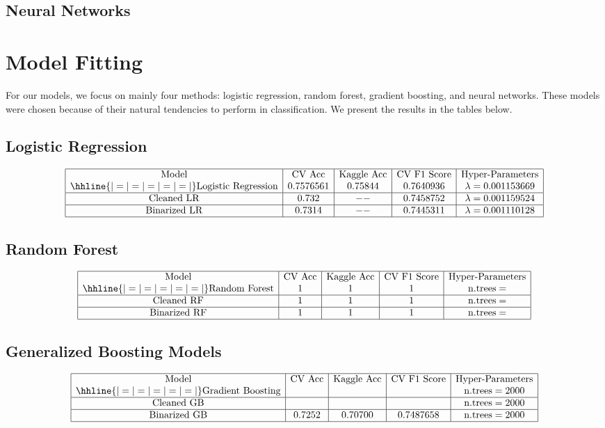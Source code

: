 \documentclass{article}
\begin{document}
\subsection{Neural Networks}

\section{Model Fitting}
For our models, we focus on mainly four methods: logistic regression, random forest, gradient boosting, and neural networks. These models were chosen because of their natural tendencies to perform in classification. We present the results in the tables below.

\subsection{Logistic Regression}
$$\begin{array}{|c|c|c|c|c|}
\hline
\text{Model} & \text{CV Acc} & \text{Kaggle Acc} & \text{CV F1 Score} & \text{Hyper-Parameters} \\
\hhline{|=|=|=|=|=|}
\text{Logistic Regression} & 0.7576561 & 0.75844 & 0.7640936 & \lambda = 0.001153669\\
\hline
\text{Cleaned LR} & 0.732 & -- & 0.7458752 & \lambda = 0.001159524 \\
\hline
\text{Binarized LR} & 0.7314 & -- & 0.7445311 & \lambda = 0.001110128 \\
\hline
\end{array}$$

\subsection{Random Forest}
$$\begin{array}{|c|c|c|c|c|}
\hline
\text{Model} & \text{CV Acc} & \text{Kaggle Acc} & \text{CV F1 Score} & \text{Hyper-Parameters}   \\
\hhline{|=|=|=|=|=|}
\text{Random Forest} & 1 & 1 & 1 & \text{n.trees} = \\
\hline
\text{Cleaned RF} & 1 & 1 & 1 & \text{n.trees} = \\
\hline
\text{Binarized RF} & 1 & 1 & 1 & \text{n.trees} = \\
\hline
\end{array}$$

\subsection{Generalized Boosting Models}
$$\begin{array}{|c|c|c|c|c|}
\hline
\text{Model} & \text{CV Acc} & \text{Kaggle Acc} & \text{CV F1 Score} & \text{Hyper-Parameters} \\
\hhline{|=|=|=|=|=|}
\text{Gradient Boosting} &  &  &  & \text{n.trees} = 2000 \\
\hline
\text{Cleaned GB} &  &  &  & \text{n.trees} = 2000 \\
\hline
\text{Binarized GB} & 0.7252 & 0.70700 & 0.7487658 & \text{n.trees} = 2000 \\
\hline
\end{array}$$
\end{document}
